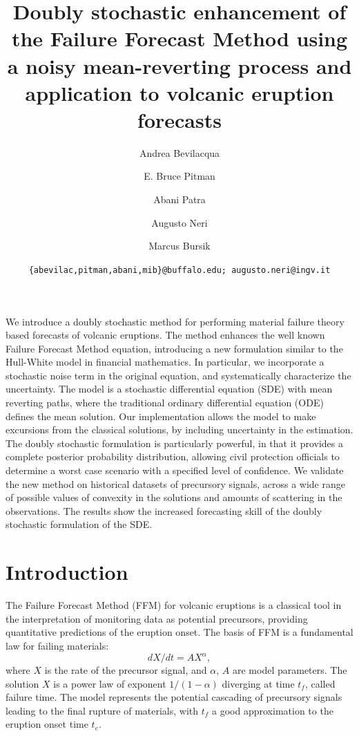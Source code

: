 \documentclass{article}
\begin{document}
\title{Doubly stochastic enhancement of the Failure Forecast Method using a noisy mean-reverting process and application to volcanic eruption forecasts}
\author[1]{Andrea Bevilacqua}
\author[2]{E. Bruce Pitman}
\author[3,4]{Abani Patra}
\author[5]{Augusto Neri}
\author[1]{Marcus Bursik}


\date{\texttt{\{abevilac,pitman,abani,mib\}@buffalo.edu; augusto.neri@ingv.it}}


\maketitle
\abstract
We introduce a doubly stochastic method for performing material failure theory based forecasts of volcanic eruptions. The method enhances the well known Failure Forecast Method equation, introducing a new formulation similar to the Hull-White model in financial mathematics. In particular, we incorporate a stochastic noise term in the original equation, and systematically characterize the uncertainty. The model is a stochastic differential equation (SDE) with mean reverting paths, where the traditional ordinary differential equation (ODE) defines the mean solution. Our implementation allows the model to make excursions from the classical solutions, by including uncertainty in the estimation. The doubly stochastic formulation is particularly powerful, in that it provides a complete posterior probability distribution, allowing civil protection officials to determine a worst case scenario with a specified level of confidence. We validate the new method on historical datasets of precursory signals, across a wide range of possible values of convexity in the solutions and amounts of scattering in the observations. The results show the increased forecasting skill of the doubly stochastic formulation of the SDE.

\section{Introduction}
The Failure Forecast Method (FFM) for volcanic eruptions is a classical tool in the interpretation of monitoring data as potential precursors, providing quantitative predictions of the eruption onset. The basis of FFM is a fundamental law for failing materials:
$$dX/dt=AX^\alpha,$$
where $X$ is the rate of the precursor signal, and $\alpha$, $A$ are model parameters. The solution $X$ is a power law of exponent $1/(1-\alpha)$ diverging at time $t_f$, called failure time. The model represents the potential cascading of precursory signals leading to the final rupture of materials, with $t_f$ a good approximation to the eruption onset time $t_e$.
\end{document}
